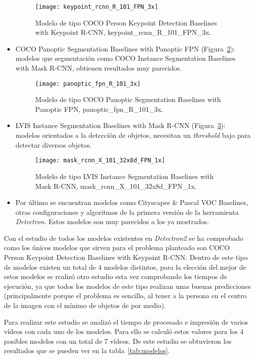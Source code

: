 \begin{itemize}
	\begin{figure}[h]
		\centering
		\texttt{[image: keypoint\_rcnn\_R\_101\_FPN\_3x]}
		\caption{Modelo de tipo COCO Person Keypoint Detection Baselines with Keypoint R-CNN, keypoint\_rcnn\_R\_101\_FPN\_3x.}
		\label{fig:keypoint_rcnn_R_101_FPN_3x}
	\end{figure}
	\item COCO Panoptic Segmentation Baselines with Panoptic FPN (Figura~\ref{fig:panoptic_fpn_R_101_3x}): modelos que segmentación como COCO Instance Segmentation Baselines with Mask R-CNN, obtienen resultados muy parecidos.
	\begin{figure}[h]
		\centering
		\texttt{[image: panoptic\_fpn\_R\_101\_3x]}
		\caption{Modelo de tipo COCO Panoptic Segmentation Baselines with Panoptic FPN, panoptic\_fpn\_R\_101\_3x.}
		\label{fig:panoptic_fpn_R_101_3x}
	\end{figure}
	\item LVIS Instance Segmentation Baselines with Mask R-CNN (Figura~\ref{fig:mask_rcnn_X_101_32x8d_FPN_1x}): modelos orientados a la detección de objetos, necesitan un \textit{threshold} bajo para detectar diversos objetos.
	\begin{figure}[h]
		\centering
		\texttt{[image: mask\_rcnn\_X\_101\_32x8d\_FPN\_1x]}
		\caption{Modelo de tipo LVIS Instance Segmentation Baselines with Mask R-CNN, mask\_rcnn\_X\_101\_32x8d\_FPN\_1x.}
		\label{fig:mask_rcnn_X_101_32x8d_FPN_1x}
	\end{figure}
	\item Por último se encuentran modelos como Cityscapes \& Pascal VOC Baselines, otras configuraciones y algoritmos de la primera versión de la herramienta \textit{Detectron}. Estos modelos son muy parecidos a los ya mostrados.
\end{itemize}

Con el estudio de todos los modelos existentes en \textit{Detectron2} se ha comprobado como los únicos modelos que sirven para el problema planteado son COCO Person Keypoint Detection Baselines with Keypoint R-CNN. Dentro de este tipo de modelos existen un total de 4 modelos distintos, para la elección del mejor de estos modelos se realizó otro estudio esta vez comprobando los tiempos de ejecución, ya que todos los modelos de este tipo realizan unas buenas predicciones (principalmente porque el problema es sencillo, al tener a la persona en el centro de la imagen con el mínimo de objetos de por medio).

Para realizar este estudio se analizó el tiempo de procesado e impresión de varios vídeos con cada uno de los modelos. Para ello se calculó estos valores para los 4 posibles modelos con un total de 7 vídeos. De este estudio se obtuvieron los resultados que se pueden ver en la tabla~\ref{tab:modelos}.

